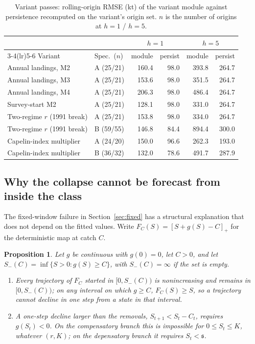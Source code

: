 \documentclass[preprint,11pt,authoryear]{elsarticle}
\newtheorem{proposition}{Proposition}
\theoremstyle{definition}
\theoremstyle{remark}
\newcommand{\Spos}[1]{\left[#1\right]_{+}}
\newcommand{\sA}{\mathfrak{s}}
\begin{document}
\begin{table}[!htb]
\centering\small
\caption{Variant passes: rolling-origin RMSE (kt) of the variant module against persistence recomputed on the variant's origin set. $n$ is the number of origins at $h=1$ / $h=5$.}
\label{tab:variants}
\begin{tabular}{@{}llrrrr@{}}
\toprule
 & & \multicolumn{2}{c}{$h=1$} & \multicolumn{2}{c}{$h=5$} \\
\cmidrule(lr){3-4}\cmidrule(lr){5-6}
Variant & Spec.\ ($n$) & module & persist & module & persist \\
\midrule
Annual landings, M2 & A (25/21) & 160.4 & 98.0 & 393.8 & 264.7 \\
Annual landings, M3 & A (25/21) & 153.6 & 98.0 & 351.5 & 264.7 \\
Annual landings, M4 & A (25/21) & 206.3 & 98.0 & 486.4 & 264.7 \\
Survey-start M2 & A (25/21) & 128.1 & 98.0 & 331.0 & 264.7 \\
Two-regime $r$ (1991 break) & A (25/21) & 153.8 & 98.0 & 334.0 & 264.7 \\
Two-regime $r$ (1991 break) & B (59/55) & 146.8 & 84.4 & 894.4 & 300.0 \\
Capelin-index multiplier & A (24/20) & 150.0 & 96.6 & 262.3 & 193.0 \\
Capelin-index multiplier & B (36/32) & 132.0 & 78.6 & 491.7 & 287.9 \\
\bottomrule
\end{tabular}
\end{table}

\FloatBarrier
\subsection{Why the collapse cannot be forecast from inside the class}\label{sec:identification}

The fixed-window failure in Section~\ref{sec:fixed} has a structural explanation that does not depend on the fitted values. Write $F_C(S) = \Spos{S + g(S) - C}$ for the deterministic map at catch $C$.

\begin{proposition}\label{prop:repeller}
Let $g$ be continuous with $g(0)=0$, let $C>0$, and let $S_-(C) = \inf\{S>0 : g(S)\ge C\}$, with $S_-(C)=\infty$ if the set is empty.
\begin{enumerate}[label=(\roman*),leftmargin=2.2em,itemsep=1pt]
\item Every trajectory of $F_C$ started in $[0,S_-(C))$ is nonincreasing and remains in $[0,S_-(C))$; on any interval on which $g \ge C$, $F_C(S)\ge S$, so a trajectory cannot decline in one step from a state in that interval.
\item A one-step decline larger than the removals, $S_{t+1} < S_t - C_t$, requires $g(S_t) < 0$. On the compensatory branch this is impossible for $0\le S_t\le K$, whatever $(r,K)$; on the depensatory branch it requires $S_t < \sA$.
\end{enumerate}
\end{proposition}
\end{document}
